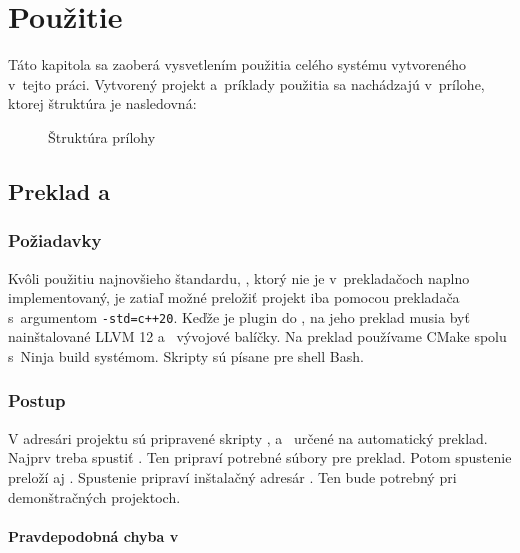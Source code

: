 \chapter{Použitie} \label{pouzitie}

Táto kapitola sa zaoberá vysvetlením použitia celého systému vytvoreného v~tejto práci. Vytvorený projekt a~príklady použitia sa nachádzajú v~prílohe, ktorej štruktúra je nasledovná:

\begin{figure}[H]
\caption{Štruktúra prílohy}
\end{figure}

\section{Preklad \PPreflection{} a~\PPreflector{}}

\subsection{Požiadavky}

Kvôli použitiu najnovšieho štandardu, \CppV{}, ktorý nie je v~prekladačoch naplno implementovaný, je zatiaľ možné preložiť projekt iba pomocou prekladača \GCCV{} s~argumentom \texttt{-std=c++20}. Keďže \PPreflector{} je plugin do \Clang{}, na jeho preklad musia byť nainštalované \textsf{LLVM 12} a~\ClangV{} vývojové balíčky. Na preklad používame \textsf{CMake} spolu s~\textsf{Ninja} build systémom. Skripty sú písane pre shell \textsf{Bash}.

\subsection{Postup}

V adresári projektu  sú pripravené skripty ,  a~ určené na automatický preklad. Najprv treba spustiť . Ten pripraví potrebné súbory pre preklad. Potom spustenie  preloží \PPreflection{} aj \PPreflector{}. Spustenie  pripraví inštalačný adresár . Ten bude potrebný pri demonštračných projektoch.

\subsubsection{Pravdepodobná chyba v~\Clang{}}

